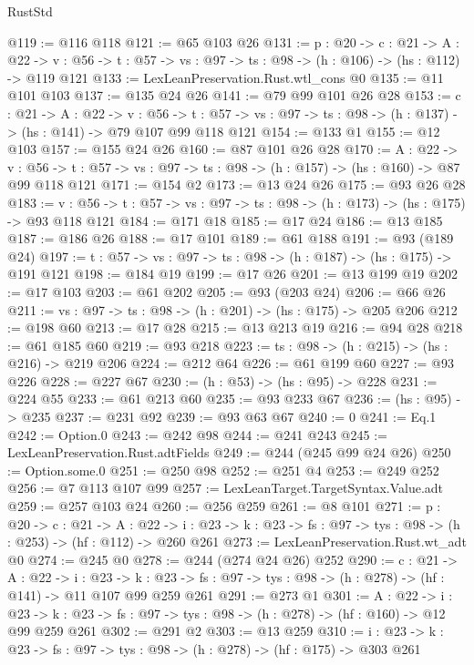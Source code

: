 \begin{lexlean}{RustStd}
\begin{coremodule}
{\begin{coremodule}
{{{{{{{{{{{{{@119 := @116 @118
@121 := @65 @103 @26
@131 := {p : @20} ->
  {c : @21} ->
  {A : @22} ->
  {v : @56} -> {t : @57} -> {vs : @97} -> {ts : @98} -> (h : @106) -> (hs : @112) -> @119 @121
@133 := LexLeanPreservation.Rust.wtl_cons @0
@135 := @11 @101 @103
@137 := @135 @24 @26
@141 := @79 @99 @101 @26 @28
@153 := {c : @21} ->
  {A : @22} ->
  {v : @56} ->
  {t : @57} -> {vs : @97} -> {ts : @98} -> (h : @137) -> (hs : @141) -> @79 @107 @99 @118 @121
@154 := @133 @1
@155 := @12 @103
@157 := @155 @24 @26
@160 := @87 @101 @26 @28
@170 := {A : @22} ->
  {v : @56} ->
  {t : @57} -> {vs : @97} -> {ts : @98} -> (h : @157) -> (hs : @160) -> @87 @99 @118 @121
@171 := @154 @2
@173 := @13 @24 @26
@175 := @93 @26 @28
@183 := {v : @56} ->
  {t : @57} -> {vs : @97} -> {ts : @98} -> (h : @173) -> (hs : @175) -> @93 @118 @121
@184 := @171 @18
@185 := @17 @24
@186 := @13 @185
@187 := @186 @26
@188 := @17 @101
@189 := @61 @188
@191 := @93 (@189 @24)
@197 := {t : @57} -> {vs : @97} -> {ts : @98} -> (h : @187) -> (hs : @175) -> @191 @121
@198 := @184 @19
@199 := @17 @26
@201 := @13 @199 @19
@202 := @17 @103
@203 := @61 @202
@205 := @93 (@203 @24)
@206 := @66 @26
@211 := {vs : @97} -> {ts : @98} -> (h : @201) -> (hs : @175) -> @205 @206
@212 := @198 @60
@213 := @17 @28
@215 := @13 @213 @19
@216 := @94 @28
@218 := @61 @185 @60
@219 := @93 @218
@223 := {ts : @98} -> (h : @215) -> (hs : @216) -> @219 @206
@224 := @212 @64
@226 := @61 @199 @60
@227 := @93 @226
@228 := @227 @67
@230 := (h : @53) -> (hs : @95) -> @228
@231 := @224 @55
@233 := @61 @213 @60
@235 := @93 @233 @67
@236 := (hs : @95) -> @235
@237 := @231 @92
@239 := @93 @63 @67
@240 := 0
@241 := Eq.{1}
@242 := Option.{0}
@243 := @242 @98
@244 := @241 @243
@245 := LexLeanPreservation.Rust.adtFields
@249 := @244 (@245 @99 @24 @26)
@250 := Option.some.{0}
@251 := @250 @98
@252 := @251 @4
@253 := @249 @252
@256 := @7 @113 @107 @99
@257 := LexLeanTarget.TargetSyntax.Value.adt
@259 := @257 @103 @24
@260 := @256 @259
@261 := @8 @101
@271 := {p : @20} ->
  {c : @21} ->
  {A : @22} ->
  {i : @23} -> {k : @23} -> {fs : @97} -> {tys : @98} -> (h : @253) -> (hf : @112) -> @260 @261
@273 := LexLeanPreservation.Rust.wt_adt @0
@274 := @245 @0
@278 := @244 (@274 @24 @26) @252
@290 := {c : @21} ->
  {A : @22} ->
  {i : @23} ->
  {k : @23} -> {fs : @97} -> {tys : @98} -> (h : @278) -> (hf : @141) -> @11 @107 @99 @259 @261
@291 := @273 @1
@301 := {A : @22} ->
  {i : @23} ->
  {k : @23} -> {fs : @97} -> {tys : @98} -> (h : @278) -> (hf : @160) -> @12 @99 @259 @261
@302 := @291 @2
@303 := @13 @259
@310 := {i : @23} ->
  {k : @23} -> {fs : @97} -> {tys : @98} -> (h : @278) -> (hf : @175) -> @303 @261
}}}}}}}}}}}}}
\end{coremodule}}
\end{coremodule}
\end{lexlean}
